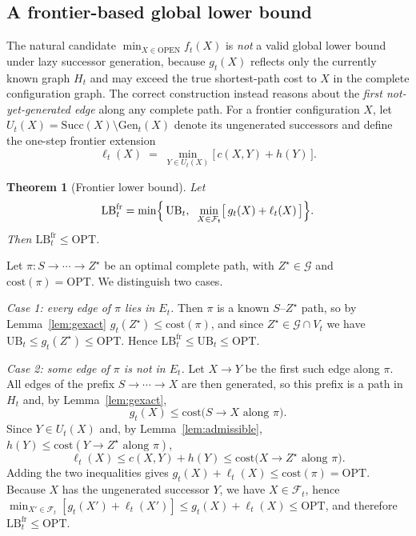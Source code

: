 \documentclass[lettersize,journal]{IEEEtran}
\makeatletter
\newtheorem{theorem}{\textbf{Theorem}}
\renewenvironment{proof}[1][\proofname]{\par
  \pushQED{\qed}%
  \normalfont \topsep6\p@\@plus6\p@\relax
  \trivlist
  \item[\hskip\parindent
        \itshape
    #1\@addpunct{.}]\ignorespaces
}{%
  \popQED\endtrivlist\@endparpenalty\z@
}
\makeatother
\begin{document}
\subsection{A frontier-based global lower bound}
\label{subsec:lb_frontier}

The natural candidate $\min_{X\in\mathrm{OPEN}} f_t(X)$ is \emph{not} a valid global lower bound under lazy successor generation, because $g_t(X)$ reflects only the currently known graph $H_t$ and may exceed the true shortest-path cost to $X$ in the complete configuration graph. The correct construction instead reasons about the \emph{first not-yet-generated edge} along any complete path. For a frontier configuration $X$, let $U_t(X)=\mathrm{Succ}(X)\setminus \mathrm{Gen}_t(X)$ denote its ungenerated successors and define the one-step frontier extension
\[
\ell_t(X)\;=\;\min_{Y\in U_t(X)}\bigl[\,c(X,Y)+h(Y)\,\bigr].
\]

\begin{theorem}[Frontier lower bound]
\label{thm:frontier}
Let
\[
\mathrm{LB}_t^{\mathrm{fr}}
=\min\Bigl\{\,\mathrm{UB}_t,\;\;
\min_{X\in\mathcal{F}_t}\bigl[\,g_t(X)+\ell_t(X)\,\bigr]\Bigr\}.
\]
Then $\mathrm{LB}_t^{\mathrm{fr}}\le \mathrm{OPT}$.
\end{theorem}
\begin{proof}
Let $\pi:S\to\cdots\to Z^\star$ be an optimal complete path, with $Z^\star\in\mathcal{G}$ and $\mathrm{cost}(\pi)=\mathrm{OPT}$. We distinguish two cases.

\emph{Case 1: every edge of $\pi$ lies in $E_t$.} Then $\pi$ is a known $S$--$Z^\star$ path, so by Lemma~\ref{lem:gexact} $g_t(Z^\star)\le \mathrm{cost}(\pi)$, and since $Z^\star\in\mathcal{G}\cap V_t$ we have $\mathrm{UB}_t\le g_t(Z^\star)\le \mathrm{OPT}$. Hence $\mathrm{LB}_t^{\mathrm{fr}}\le \mathrm{UB}_t\le \mathrm{OPT}$.

\emph{Case 2: some edge of $\pi$ is not in $E_t$.} Let $X\to Y$ be the first such edge along $\pi$. All edges of the prefix $S\to\cdots\to X$ are then generated, so this prefix is a path in $H_t$ and, by Lemma~\ref{lem:gexact},
\[
g_t(X)\le \mathrm{cost}\bigl(S\to X \text{ along }\pi\bigr).
\]
Since $Y\in U_t(X)$ and, by Lemma~\ref{lem:admissible}, $h(Y)\le \mathrm{cost}(Y\to Z^\star \text{ along }\pi)$,
\[
\ell_t(X)\le c(X,Y)+h(Y)\le \mathrm{cost}\bigl(X\to Z^\star\text{ along }\pi\bigr).
\]
Adding the two inequalities gives $g_t(X)+\ell_t(X)\le \mathrm{cost}(\pi)=\mathrm{OPT}$. Because $X$ has the ungenerated successor $Y$, we have $X\in\mathcal{F}_t$, hence $\min_{X'\in\mathcal{F}_t}[g_t(X')+\ell_t(X')]\le g_t(X)+\ell_t(X)\le \mathrm{OPT}$, and therefore $\mathrm{LB}_t^{\mathrm{fr}}\le\mathrm{OPT}$.
\end{proof}
\end{document}
